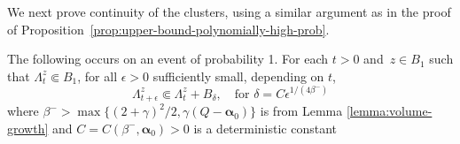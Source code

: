 \documentclass[12pt]{amsart}
\numberwithin{equation}{section}
\newcommand{\cluster}[2]{\hyperref[eq:non-co-set]{\mathit{\Lambda}^{#1}_{#2}}}
\begin{document}
	
	We next prove continuity of the clusters, using a similar argument as in the proof of Proposition~\ref{prop:upper-bound-polynomially-high-prob}.   
	
	\begin{prop} \label{prop:continuity-of-clusters}
		The following occurs on an event of probability 1. 
		For each $t > 0$ and~$z \in B_1$ such that ${\cluster{z}{t}} \Subset B_1$, for all $\epsilon > 0$ sufficiently small, depending on $t$,
		\[
		{\cluster{z}{t + \epsilon}} \Subset {\cluster{z}{t}} + B_{\delta} ,\quad \text{for $\delta = C \epsilon^{1/(4\beta^-)}$} %
		\]
		where $\beta^- > \max\{(2+\gamma)^2/2, \gamma(Q-\boldsymbol{\alpha}_0)\}$ is from Lemma \ref{lemma:volume-growth} and  $C = C(\beta^-,\boldsymbol{\alpha}_0) >0$ is a deterministic constant %
	\end{prop}
	
\end{document}
